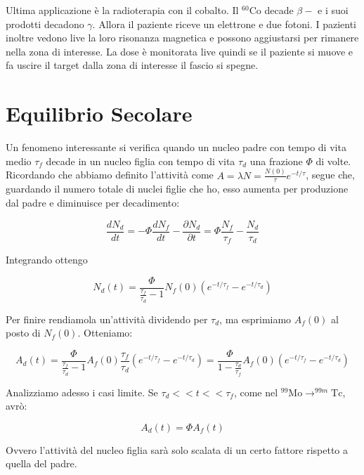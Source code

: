 \documentclass [a4paper, twoside] {book}
\begin{document}
Ultima applicazione è la radioterapia con il cobalto. Il $^{60}\text{Co}$ decade $\beta-$ e i suoi prodotti decadono $\gamma$. Allora il paziente riceve un elettrone e due fotoni. I pazienti inoltre vedono live la loro risonanza magnetica e possono aggiustarsi per rimanere nella zona di interesse. La dose è monitorata live quindi se il paziente si muove e fa uscire il target dalla zona di interesse il fascio si spegne.

\section{Equilibrio Secolare}

Un fenomeno interessante si verifica quando un nucleo padre con tempo di vita medio $\tau_f$ decade in un nucleo figlia con tempo di vita $\tau_d$ una frazione $\Phi$ di volte. Ricordando che abbiamo definito l'attività come $A=\lambda N=\frac{N(0)}{\tau}e^{-t/\tau}$, segue che, guardando il numero totale di nuclei figlie che ho, esso aumenta per produzione dal padre e diminuisce per decadimento:

\begin{equation}
\frac{dN_d}{dt}=-\Phi \frac{dN_f}{dt} - \frac{\partial N_d}{\partial t} = \Phi \frac{N_f}{\tau_f} - \frac{N_d}{\tau_d}
\end{equation}

Integrando ottengo

\begin{equation}
N_d(t)=\frac{\Phi}{\frac{\tau_f}{\tau_d}-1}N_f(0)(e^{-t/\tau_f}-e^{-t/\tau_d})
\end{equation}

Per finire rendiamola un'attività dividendo per $\tau_d$, ma esprimiamo $A_f(0)$ al posto di $N_f(0)$. Otteniamo:

\begin{equation}
A_d(t)=\frac{\Phi}{\frac{\tau_f}{\tau_d}-1}A_f(0)\frac{\tau_f}{\tau_d}(e^{-t/\tau_f}-e^{-t/\tau_d}) =\frac{\Phi}{1-\frac{\tau_d}{\tau_f}}A_f(0)(e^{-t/\tau_f}-e^{-t/\tau_d})
\end{equation}

Analizziamo adesso i casi limite. Se $\tau_d << t << \tau_f$, come nel $^{99}\text{Mo} \rightarrow ^{99m}\text{Tc}$, avrò:

\begin{equation}
A_d(t)=\Phi A_f(t)
\end{equation}

Ovvero l'attività del nucleo figlia sarà solo scalata di un certo fattore rispetto a quella del padre.
\end{document}
